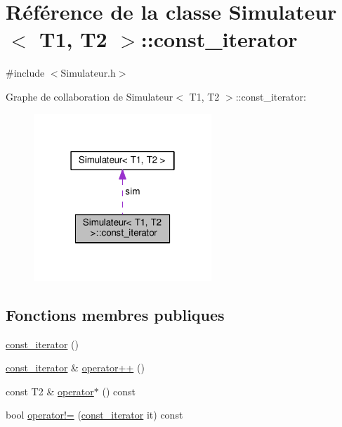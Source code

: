 \hypertarget{class_simulateur_1_1const__iterator}{}\section{Référence de la classe Simulateur$<$ T1, T2 $>$\+:\+:const\+\_\+iterator}
\label{class_simulateur_1_1const__iterator}


{\ttfamily \#include $<$Simulateur.\+h$>$}



Graphe de collaboration de Simulateur$<$ T1, T2 $>$\+:\+:const\+\_\+iterator\+:
\nopagebreak
\begin{figure}[H]
\begin{center}
\leavevmode
\includegraphics[width=190pt]{class_simulateur_1_1const__iterator__coll__graph}
\end{center}
\end{figure}
\subsection*{Fonctions membres publiques}
\begin{DoxyCompactItemize}
\item 
\hyperlink{class_simulateur_1_1const__iterator_adefd901a2eed44f15f00771cca1c940d}{const\+\_\+iterator} ()
\item 
\hyperlink{class_simulateur_1_1const__iterator}{const\+\_\+iterator} \& \hyperlink{class_simulateur_1_1const__iterator_ab5d1bea2f07780e6ae8d11a0accbfc87}{operator++} ()
\item 
const T2 \& \hyperlink{class_simulateur_1_1const__iterator_a4bc17b0d2decb5fb010155447f313c37}{operator$\ast$} () const 
\item 
bool \hyperlink{class_simulateur_1_1const__iterator_a1892ab7977db8b778365d94436652414}{operator!=} (\hyperlink{class_simulateur_1_1const__iterator}{const\+\_\+iterator} it) const 
\end{DoxyCompactItemize}
